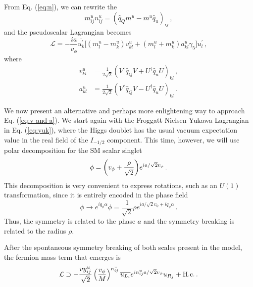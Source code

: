 \documentclass[prd,amsfonts,onecolumn,superscriptaddress,aps,nofootinbib,11pt]{revtex4-1}
\begin{document}
From Eq. (\ref{eq:n}), we can rewrite the 
\begin{equation}
	m_{ij}^u n_{ij}^u = (\hat{q}_Q m^u - m^u \hat{q}_u)_{ij} \,,
\end{equation}
and the pseudoscalar Lagrangian becomes
\begin{equation}\label{eq:LFV-lagr-FN}
    \mathcal{L} = -\frac{ia}{v_\phi} \overline{u_k^\prime} \bigg[  (m^u_l- m^u_k )v_{kl}^u + (m^u_l + m^u_k )a_{kl}^u \gamma_5 \bigg] u_l^\prime \,,
\end{equation}
where
\begin{equation}\label{eq:v-and-a}
    \begin{split}
        v_{kl}^u &= \frac{1}{2\sqrt{2} } \left( V^\dagger \hat{q}_Q V + U^\dagger \hat{q}_u U \right)_{kl} \,, \\
        a_{kl}^u &= \frac{1}{2\sqrt{2} } \left( V^\dagger \hat{q}_Q V - U^\dagger \hat{q}_u U \right)_{kl} \,.
    \end{split}
\end{equation}

We now present an alternative and perhaps more enlightening way to approach Eq. (\ref{eq:v-and-a}). We start again with the Froggatt-Nielsen Yukawa Lagrangian in Eq. (\ref{eq:yuk}), where the Higgs doublet has the usual vacuum expectation value in the real field of the $I_{-1/2}$ component. This time, however, we will use polar decomposition for the SM scalar singlet
\begin{equation}
    \phi =  \qty(v_\phi + \frac{\rho}{\sqrt{2}}) e^{i a / \sqrt{2} v_\phi} \,.
\end{equation}
This decomposition is very convenient to express rotations, such as an $U(1)$ transformation, since it is entirely encoded in the phase field
\begin{equation}
    \phi \to e^{i q_\phi \alpha} \phi = \frac{1}{\sqrt{2}} \rho e^{ia/\sqrt{2}v_\phi + iq_\phi \alpha} \,.
\end{equation}
Thus, the symmetry is related to the phase $a$ and the symmetry breaking is related to the radius $\rho$.


After the spontaneous symmetry breaking of both scales present in the model, the fermion mass term that emerges is
\begin{equation}
    \mathcal{L} \supset -\frac{vy^u_{ij}}{\sqrt{2}} \left( \frac{v_\phi}{M} \right)^{n_{ij}^u}  \overline{u_{L_i}} e^{i n_{ij}^u a/\sqrt{2}v_\phi} u_{R_j} + \rm{H.c.} \,.
\end{equation}
\end{document}
